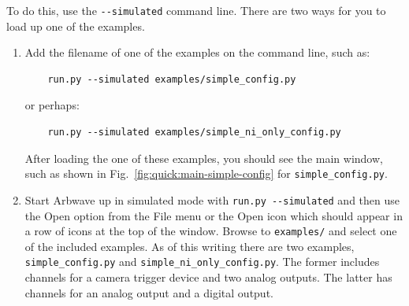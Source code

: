 To do this, use the \verb|--simulated| command line.  There are two ways for you
to load up one of the examples.
\begin{enumerate}
  \item Add the filename of one of the examples on the command line, such as:\\
    \begin{verbatim}
    run.py --simulated examples/simple_config.py
    \end{verbatim}
    or perhaps:
    \begin{verbatim}
    run.py --simulated examples/simple_ni_only_config.py
    \end{verbatim}
    After loading the one of these examples, you should see the main window,
    such as shown in Fig.~\ref{fig:quick:main-simple-config} for \verb|simple_config.py|.
  \item Start Arbwave up in simulated mode with \verb|run.py --simulated| and
  then use the Open option from the File menu or the Open icon which should appear 
  in a row of icons at the top of the window.  Browse to \verb|examples/| and select one of
  the included examples.  As of this writing there are two examples, \verb|simple_config.py|
  and \verb|simple_ni_only_config.py|.  The former includes channels for a camera trigger device
  and two analog outputs.  The latter has channels for an analog output and a digital output.
\end{enumerate}

